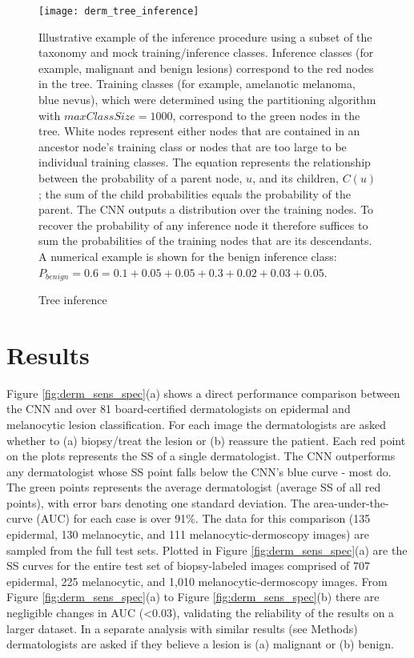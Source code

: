 \begin{figure}
\texttt{[image: derm\_tree\_inference]}
\caption{Tree inference}
\vspace{12px}
Illustrative example of the inference procedure using a subset of the taxonomy and mock training/inference classes. Inference classes (for example, malignant and benign lesions) correspond to the red nodes in the tree. Training classes (for example, amelanotic melanoma, blue nevus), which were determined using the partitioning algorithm with $maxClassSize = 1000$, correspond to the green nodes in the tree. White nodes represent either nodes that are contained in an ancestor node’s training class or nodes that are too large to be individual training classes. The equation represents the relationship between the probability of a parent node, $u$, and its children, $C(u)$; the sum of the child probabilities equals the probability of the parent. The CNN outputs a distribution over the training nodes. To recover the probability of any inference node it therefore suffices to sum the probabilities of the training nodes that are its descendants. A numerical example is shown for the benign inference class: $P_{benign} = 0.6 = 0.1 + 0.05 + 0.05 + 0.3 + 0.02 + 0.03 + 0.05$.
\label{fig:derm_tree_inference}
\end{figure}

\section{Results}

Figure \ref{fig:derm_sens_spec}(a) shows a direct performance comparison between the CNN and over 81 board-certified dermatologists on epidermal and melanocytic lesion classification. For each image the dermatologists are asked whether to (a) biopsy/treat the lesion or (b) reassure the patient. Each red point on the plots represents the SS of a single dermatologist. The CNN outperforms any dermatologist whose SS point falls below the CNN’s blue curve - most do. The green points represents the average dermatologist (average SS of all red points), with error bars denoting one standard deviation. The area-under-the-curve (AUC) for each case is over 91\%. The data for this comparison (135 epidermal, 130 melanocytic, and 111 melanocytic-dermoscopy images) are sampled from the full test sets. Plotted in Figure \ref{fig:derm_sens_spec}(a) are the SS curves for the entire test set of biopsy-labeled images comprised of 707 epidermal, 225 melanocytic, and 1,010 melanocytic-dermoscopy images. From Figure \ref{fig:derm_sens_spec}(a) to Figure \ref{fig:derm_sens_spec}(b) there are negligible changes in AUC (<0.03), validating the reliability of the results on a larger dataset. In a separate analysis with similar results (see Methods) dermatologists are asked if they believe a lesion is (a) malignant or (b) benign.

